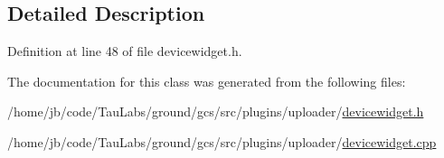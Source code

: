 \subsection{\-Detailed \-Description}


\-Definition at line 48 of file devicewidget.\-h.



\-The documentation for this class was generated from the following files\-:\begin{DoxyCompactItemize}
\item 
/home/jb/code/\-Tau\-Labs/ground/gcs/src/plugins/uploader/\hyperlink{devicewidget_8h}{devicewidget.\-h}\item 
/home/jb/code/\-Tau\-Labs/ground/gcs/src/plugins/uploader/\hyperlink{devicewidget_8cpp}{devicewidget.\-cpp}\end{DoxyCompactItemize}
